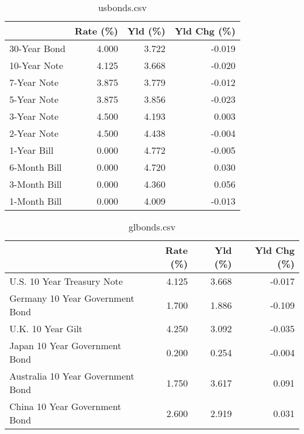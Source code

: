 \documentclass{article}%
\begin{document}
%


\begin{table}[htbp]%
\caption{usbonds.csv}%
\centering%
\begin{adjustbox}{width=1\textwidth}%
\begin{tabular}{lrrr}
\toprule
             &  Rate (\%) &  Yld (\%) &  Yld Chg (\%) \\
\midrule
30-Year Bond &     4.000 &    3.722 &       -0.019 \\
10-Year Note &     4.125 &    3.668 &       -0.020 \\
 7-Year Note &     3.875 &    3.779 &       -0.012 \\
 5-Year Note &     3.875 &    3.856 &       -0.023 \\
 3-Year Note &     4.500 &    4.193 &        0.003 \\
 2-Year Note &     4.500 &    4.438 &       -0.004 \\
 1-Year Bill &     0.000 &    4.772 &       -0.005 \\
6-Month Bill &     0.000 &    4.720 &        0.030 \\
3-Month Bill &     0.000 &    4.360 &        0.056 \\
1-Month Bill &     0.000 &    4.009 &       -0.013 \\
\bottomrule
\end{tabular}
%
\end{adjustbox}%
\end{table}

%


\begin{table}[htbp]%
\caption{glbonds.csv}%
\centering%
\begin{adjustbox}{width=1\textwidth}%
\begin{tabular}{lrrr}
\toprule
                                  &  Rate (\%) &  Yld (\%) &  Yld Chg (\%) \\
\midrule
       U.S. 10 Year Treasury Note &     4.125 &    3.668 &       -0.017 \\
  Germany 10 Year Government Bond &     1.700 &    1.886 &       -0.109 \\
                U.K. 10 Year Gilt &     4.250 &    3.092 &       -0.035 \\
    Japan 10 Year Government Bond &     0.200 &    0.254 &       -0.004 \\
Australia 10 Year Government Bond &     1.750 &    3.617 &        0.091 \\
    China 10 Year Government Bond &     2.600 &    2.919 &        0.031 \\
\bottomrule
\end{tabular}
%
\end{adjustbox}%
\end{table}
\end{document}
